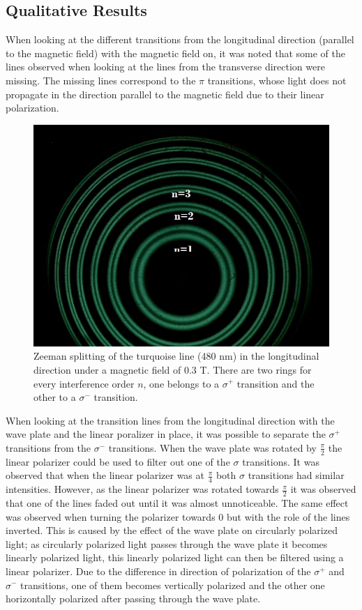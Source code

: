 \documentclass[12pt]{article}
\begin{document}
\subsection{Qualitative Results}
When looking at the different transitions from the longitudinal direction (parallel to the magnetic field) with the magnetic field on, it was noted that some of the lines observed when looking at the lines from the transverse direction were missing. The missing lines correspond to the $\pi$ transitions, whose light does not propagate in the direction parallel to the magnetic field due to their linear polarization.\\
\begin{figure}[H]
    \centering
    \includegraphics[width=0.6 \textwidth]{Lines.jpg}
    \caption{Zeeman splitting of the turquoise line (480 nm)  in the longitudinal direction under a magnetic field of $0.3$ T. There are two rings for every interference order $n$, one belongs to a $\sigma^+$ transition and the other to a $\sigma^-$ transition.}
\end{figure}
\noindent
When looking at the transition lines from the longitudinal direction with the wave plate and the linear poralizer in place, it was possible to separate the $\sigma^+$ transitions from the $\sigma^-$ transitions. When the wave plate was rotated by $\frac{\pi}{2}$ the linear polarizer could be used to filter out one of the $\sigma$ transitions. It was observed that when the linear polarizer was at $\frac{\pi}{4}$ both $\sigma$ transitions had similar intensities. However, as the linear polarizer was rotated towards $\frac{\pi}{2}$ it was observed that one of the lines faded out until it was almost unnoticeable. The same effect was observed when turning the polarizer towards $0$ but with the role of the lines inverted. This is caused by the effect of the wave plate on circularly polarized light; as circularly polarized light passes through the wave plate it becomes linearly polarized light, this linearly polarized light can then be filtered using a linear polarizer. Due to the difference in direction of polarization of the $\sigma^+$ and $\sigma^-$ transitions, one of them becomes vertically polarized and the other one horizontally polarized after passing through the wave plate. 
\end{document}
